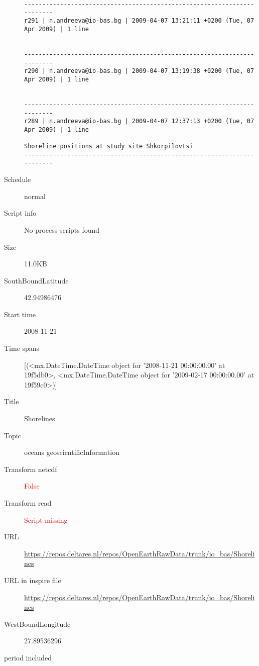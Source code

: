 \documentclass[9]{report}
\begin{document}
\begin{description}
\begin{verbatim}
------------------------------------------------------------------------
r291 | n.andreeva@io-bas.bg | 2009-04-07 13:21:11 +0200 (Tue, 07 Apr 2009) | 1 line


------------------------------------------------------------------------
r290 | n.andreeva@io-bas.bg | 2009-04-07 13:19:38 +0200 (Tue, 07 Apr 2009) | 1 line


------------------------------------------------------------------------
r289 | n.andreeva@io-bas.bg | 2009-04-07 12:37:13 +0200 (Tue, 07 Apr 2009) | 1 line

Shoreline positions at study site Shkorpilovtsi
------------------------------------------------------------------------

\end{verbatim}
  \item[Schedule] normal
  \item[Script info] No process scripts found
  \item[Size] 11.0KB
  \item[SouthBoundLatitude] 42.94986476
  \item[Start time] 2008-11-21
  \item[Time spans] [(<mx.DateTime.DateTime object for '2008-11-21 00:00:00.00' at 19f5db0>, <mx.DateTime.DateTime object for '2009-02-17 00:00:00.00' at 19f59c0>)]
  \item[Title]  Shorelines 
  \item[Topic] oceans geoscientificInformation
  \item[Transform netcdf] \textcolor{red}{False}
  \item[Transform read] \textcolor{red}{Script missing}
  \item[URL] \href{https://repos.deltares.nl/repos/OpenEarthRawData/trunk/io\_bas/Shorelines}{https://repos.deltares.nl/repos/OpenEarthRawData/trunk/io\_bas/Shorelines}
  \item[URL in inspire file] \href{https://repos.deltares.nl/repos/OpenEarthRawData/trunk/io\_bas/Shorelines}{https://repos.deltares.nl/repos/OpenEarthRawData/trunk/io\_bas/Shorelines}
  \item[WestBoundLongitude] 27.89536296
  \item[period included] 
\end{description}
\end{document}
